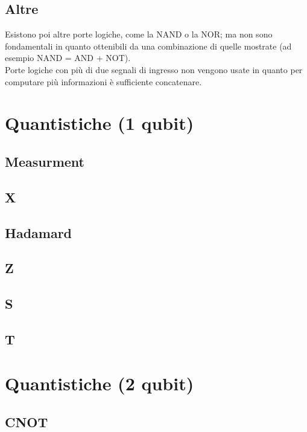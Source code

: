 \subsection{Altre}
Esistono poi altre porte logiche, come la NAND o la NOR; ma non sono fondamentali in quanto ottenibili da una combinazione di quelle mostrate (ad esempio NAND = AND + NOT).\\
Porte logiche con più di due segnali di ingresso non vengono usate in quanto per computare più informazioni è sufficiente concatenare.
\section{Quantistiche (1 qubit)}
\subsection{Measurment}
\subsection{X}
\subsection{Hadamard}
\subsection{Z}
\subsection{S}
\subsection{T}
\section{Quantistiche (2 qubit)}
\subsection{CNOT}